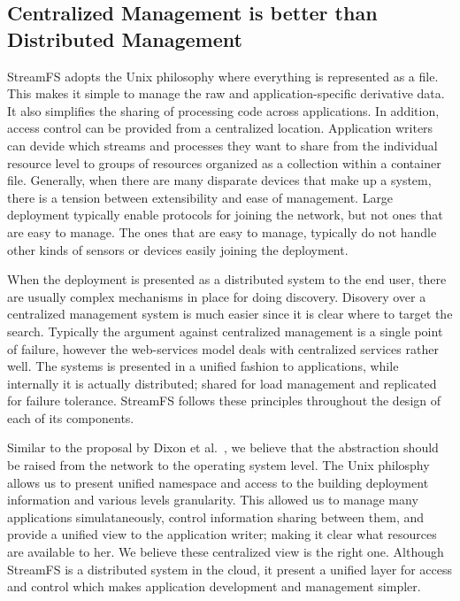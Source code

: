 \subsection{Centralized Management is better than Distributed Management}
StreamFS adopts the Unix philosophy where everything is represented as a file.  This makes it simple to manage the raw
and application-specific derivative data.  It also simplifies the sharing of processing code across applications.  In addition, 
access control can be provided from a centralized location.  Application writers can devide which streams and processes they 
want to share from the individual resource level to groups of resources organized as a collection within a container file.
Generally, when there are many disparate devices that make up a system, there is a tension between extensibility 
and ease of management.  Large deployment typically enable protocols for joining the network, but not ones that are 
easy to manage.  The ones that are easy to manage, typically do not handle other kinds of sensors or devices easily joining
the deployment.

When the deployment is presented as a distributed system to the end user, there are usually complex mechanisms in place for doing 
discovery.  Disovery over a centralized management system is much easier since it is clear where to target the search.
Typically the argument against centralized management is a single point of failure, however the web-services model
deals with centralized services rather well.  The systems is presented in a unified fashion to applications, while 
internally it is actually distributed; shared for load management and replicated for failure tolerance.  StreamFS follows
these principles throughout the design of each of its components.

Similar to the proposal by Dixon et al.~\cite{homeos}, we believe that the abstraction should be raised from the network
to the operating system level.  The Unix philosphy allows us to present unified namespace and access to the building deployment
information and various levels granularity.  This allowed us to manage many applications simulataneously, control information
sharing between them, and provide a unified view to the application writer; making it clear what resources are available to her.
We believe these centralized view is the right one.  Although StreamFS is a distributed system in the cloud, it present a unified 
layer for access and control which makes application development and management simpler.


